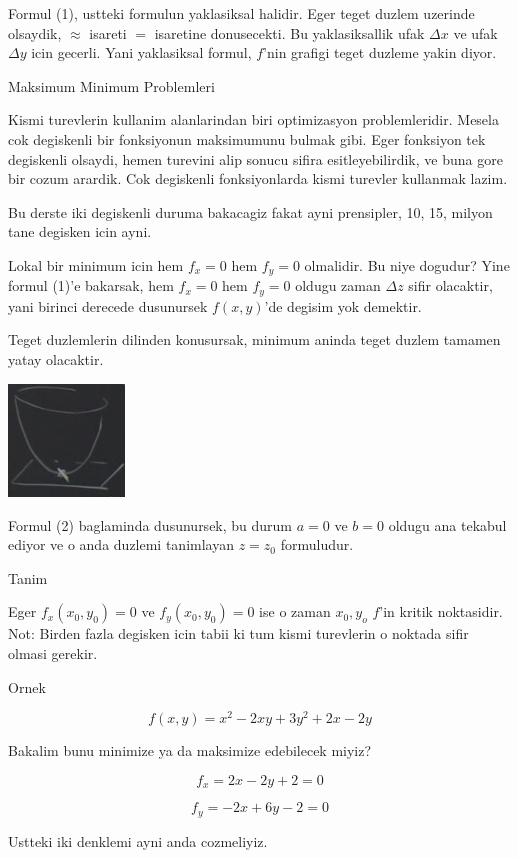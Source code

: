 \documentclass[12pt,fleqn]{article}\usepackage{../common}
\begin{document}
Formul (1), ustteki formulun yaklasiksal halidir. Eger teget duzlem
uzerinde olsaydik, $\approx$ isareti $=$ isaretine donusecekti. Bu
yaklasiksallik ufak $\Delta x$ ve ufak $\Delta y$ icin gecerli. Yani
yaklasiksal formul, $f$'nin grafigi teget duzleme yakin diyor. 

Maksimum Minimum Problemleri 

Kismi turevlerin kullanim alanlarindan biri optimizasyon
problemleridir. Mesela cok degiskenli bir fonksiyonun maksimumunu bulmak
gibi. Eger fonksiyon tek degiskenli olsaydi, hemen turevini alip sonucu
sifira esitleyebilirdik, ve buna gore bir cozum arardik. Cok degiskenli
fonksiyonlarda kismi turevler kullanmak lazim. 

Bu derste iki degiskenli duruma bakacagiz fakat ayni prensipler, 10, 15,
milyon tane degisken icin ayni. 

Lokal bir minimum icin hem $f_x=0$ hem $f_y=0$ olmalidir. Bu niye
dogudur? Yine formul (1)'e bakarsak, hem $f_x=0$ hem $f_y=0$ oldugu
zaman $\Delta z$ sifir olacaktir, yani birinci derecede dusunursek
$f(x,y)$'de degisim yok demektir. 

Teget duzlemlerin dilinden konusursak, minimum aninda teget duzlem tamamen
yatay olacaktir. 

\includegraphics[height=3cm]{9_3.png}

Formul (2) baglaminda dusunursek, bu durum $a=0$ ve $b=0$ oldugu ana
tekabul ediyor ve o anda duzlemi tanimlayan $z = z_0$ formuludur. 

Tanim

Eger $f_x(x_0,y_0)= 0$ ve $f_y(x_0,y_0)= 0$ ise o zaman $x_0,y_o$ $f$'in
kritik noktasidir. Not: Birden fazla degisken icin tabii ki tum kismi
turevlerin o noktada sifir olmasi gerekir.

Ornek

\[ f(x,y) = x^2 - 2xy + 3y^2 + 2x - 2y \]

Bakalim bunu minimize ya da maksimize edebilecek miyiz? 

\[ f_x = 2x - 2y + 2 = 0\]

\[ f_y = -2x + 6y - 2 = 0 \]

Ustteki iki denklemi ayni anda cozmeliyiz. 
\end{document}
